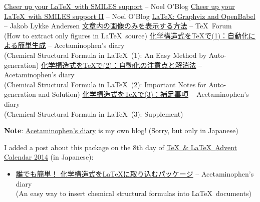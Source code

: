 \documentclass[12pt]{ltjsarticle}
\begin{document}
\clearpage

\begin{thebibliography}{9}
\href{http://baoilleach.blogspot.jp/2012/03/cheer-up-your-latex-with-smiles-support.html}{Cheer up your \LaTeX\ with SMILES support} -- Noel O'Blog
\href{http://baoilleach.blogspot.jp/2012/04/cheer-up-your-latex-with-smiles-support.html}{Cheer up your \LaTeX\ with SMILES support II} -- Noel O'Blog
\href{http://imada.sdu.dk/~jlandersen/}{\LaTeX: Graphviz and OpenBabel} -- Jakob Lykke Andersen
\href{http://oku.edu.mie-u.ac.jp/tex/mod/forum/discuss.php?d=1411}{文章内の画像のみを表示する方法} -- \TeX\ Forum \\
(How to extract only figures in \LaTeX\ source)
\href{http://acetaminophen.hatenablog.com/entry/2014/11/02/130624}{化学構造式を\TeX で(1)：自動化による簡単生成} -- Acetaminophen's diary \\
(Chemical Structural Formula in \LaTeX\ (1): An Easy Method by Auto-generation)
\href{http://acetaminophen.hatenablog.com/entry/2014/11/02/130624}{化学構造式を\TeX で(2)：自動化の注意点と解消法} -- Acetaminophen's diary \\
(Chemical Structural Formula in \LaTeX\ (2): Important Notes for Auto-generation and Solution)
\href{http://acetaminophen.hatenablog.com/entry/2014/11/05/135927}{化学構造式を\TeX で(3)：補足事項} -- Acetaminophen's diary \\
(Chemical Structural Formula in \LaTeX\ (3): Supplement)
\end{thebibliography}

\noindent
\textbf{Note}: \href{http://acetaminophen.hatenablog.com/}{Acetaminophen's diary} is my own blog! (Sorry, but only in Japanese)

I added a post about this package on the 8th day of \href{http://www.adventar.org/calendars/553}{\TeX\ \& \LaTeX\ Advent Calendar 2014} (in Japanese):
\begin{itemize}
\item \href{http://acetaminophen.hatenablog.com/entry/2014/12/08/053519}{誰でも簡単！ 化学構造式を\LaTeX に取り込むパッケージ} -- Acetaminophen's diary \\
(An easy way to insert chemical structural formulas into \LaTeX\ documents)
\end{itemize}
\end{document}
